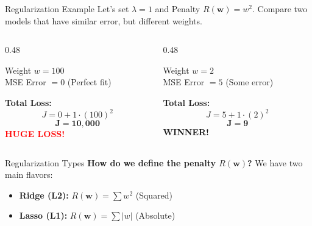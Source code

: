 \begin{frame}{Regularization Example}
    Let's set $\lambda = 1$ and Penalty $R(\mathbf{w}) = w^2$.
    Compare two models that have similar error, but different weights.
    
    \vspace{1em}
    \begin{columns}[c]
        \begin{column}{0.48\textwidth}
            \begin{tcolorbox}[colback=red!5, title=\textbf{Model A (Overfit)}]
                Weight $w = 100$ \\
                MSE Error $= 0$ (Perfect fit)
                
                \vspace{0.5em}
                \textbf{Total Loss:}
                $$ J = 0 + 1 \cdot (100)^2 $$
                $$ \mathbf{J = 10,000} $$
                \vspace{0.2em}
                \centering \textcolor{red}{\textbf{HUGE LOSS!}}
            \end{tcolorbox}
        \end{column}
        
        \begin{column}{0.48\textwidth}
            \begin{tcolorbox}[colback=green!5, title=\textbf{Model B (Balanced)}]
                Weight $w = 2$ \\
                MSE Error $= 5$ (Some error)
                
                \vspace{0.5em}
                \textbf{Total Loss:}
                $$ J = 5 + 1 \cdot (2)^2 $$
                $$ \mathbf{J = 9} $$
                \vspace{0.2em}
                \centering \textcolor{green!60!black}{\textbf{WINNER!}}
            \end{tcolorbox}
        \end{column}
    \end{columns}
\end{frame}

\begin{frame}{Regularization Types}
        \textbf{How do we define the penalty $R(\mathbf{w})$?}
    We have two main flavors:
    \begin{itemize}
        \item \textbf{Ridge (L2):} $R(\mathbf{w}) = \sum w^2$ (Squared)
        \item \textbf{Lasso (L1):} $R(\mathbf{w}) = \sum |w|$ (Absolute)
    \end{itemize}
\end{frame}

